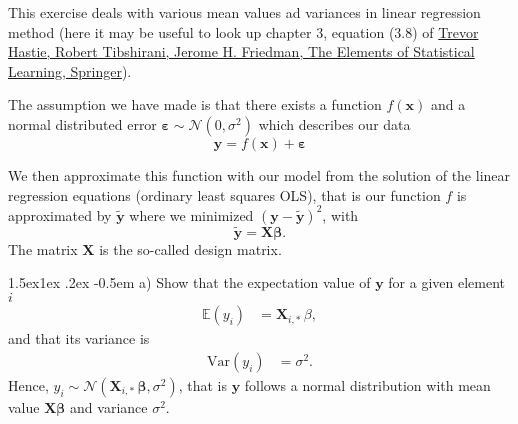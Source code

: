 \documentclass[%
oneside,                 %
final,                   %
10pt]{article}
\makeatletter
\newenvironment{doconceexercise}{}{}
\newcounter{doconceexercisecounter}
\newcommand\subex{\@startsection{paragraph}{4}{\z@}%
                  {1.5ex\@plus1ex \@minus.2ex}%
                  {-0.5em}%
                  {\normalfont\normalsize\bfseries}}
\makeatother
\begin{document}
\begin{doconceexercise}



This exercise deals with various mean values ad variances in  linear regression method (here it may be useful to look up chapter 3, equation (3.8) of \href{{https://www.springer.com/gp/book/9780387848570}}{Trevor Hastie, Robert Tibshirani, Jerome H. Friedman, The Elements of Statistical Learning, Springer}).

The assumption we have made is 
that there exists a function $f(\bm{x})$ and  a normal distributed error $\bm{\varepsilon}\sim \mathcal{N}(0, \sigma^2)$
which describes our data
\[
\bm{y} = f(\bm{x})+\bm{\varepsilon}
\]

We then approximate this function with our model from the solution of the linear regression equations (ordinary least squares OLS), that is our
function $f$ is approximated by $\bm{\tilde{y}}$ where we minimized  $(\bm{y}-\bm{\tilde{y}})^2$, with
\[
\bm{\tilde{y}} = \bm{X}\bm{\beta}.
\]
The matrix $\bm{X}$ is the so-called design matrix.


\subex{a)}
Show that  the expectation value of $\bm{y}$ for a given element $i$ 
\begin{align*} 
\mathbb{E}(y_i) & =\mathbf{X}_{i, \ast} \, \beta, 
\end{align*} 
and that
its variance is 
\begin{align*} \mbox{Var}(y_i) & = \sigma^2.  
\end{align*}
Hence, $y_i \sim \mathcal{N}( \mathbf{X}_{i, \ast} \, \bm{\beta}, \sigma^2)$, that is $\bm{y}$ follows a normal distribution with 
mean value $\bm{X}\bm{\beta}$ and variance $\sigma^2$.



\end{doconceexercise}
\end{document}
